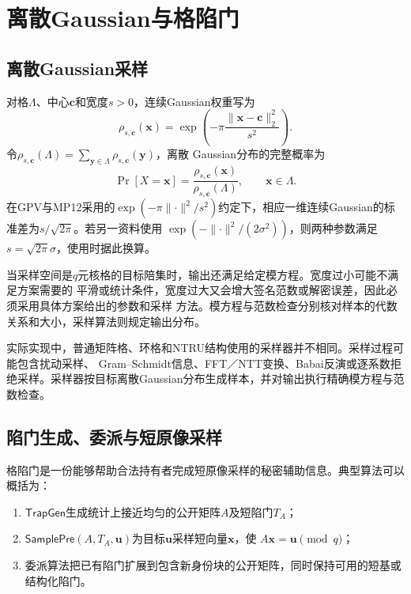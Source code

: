 \section{离散Gaussian与格陷门}

\subsection{离散Gaussian采样}

对格$\Lambda$、中心$\mathbf c$和宽度$s>0$，连续Gaussian权重写为
\[
 \rho_{s,\mathbf c}(\mathbf x)=
 \exp\!\left(-\pi\frac{\lVert\mathbf x-\mathbf c\rVert_2^2}{s^2}\right).
\]
令$\rho_{s,\mathbf c}(\Lambda)=\sum_{\mathbf y\in\Lambda}\rho_{s,\mathbf c}(\mathbf y)$，离散
Gaussian分布的完整概率为
\[
 \Pr[X=\mathbf x]
 =\frac{\rho_{s,\mathbf c}(\mathbf x)}{\rho_{s,\mathbf c}(\Lambda)},
 \qquad \mathbf x\in\Lambda.
\]
在GPV与MP12采用的$\exp(-\pi\lVert\cdot\rVert^2/s^2)$约定下，相应一维连续Gaussian的标准差为$s/\sqrt{2\pi}$。若另一资料使用
$\exp(-\lVert\cdot\rVert^2/(2\sigma^2))$，则两种参数满足$s=\sqrt{2\pi}\sigma$，使用时据此换算\cite{gpv2008,micciancio2012trapdoors}。

当采样空间是$q$元核格的目标陪集时，输出还满足给定模方程。宽度过小可能不满足方案需要的
平滑或统计条件，宽度过大又会增大签名范数或解密误差，因此必须采用具体方案给出的参数和采样
方法。模方程与范数检查分别核对样本的代数关系和大小，采样算法则规定输出分布。

实际实现中，普通矩阵格、环格和NTRU结构使用的采样器并不相同。采样过程可能包含扰动采样、
Gram--Schmidt信息、FFT／NTT变换、Babai反演或逐系数拒绝采样。采样器按目标离散Gaussian分布生成样本，并对输出执行精确模方程与范数检查。

\subsection{陷门生成、委派与短原像采样}

格陷门是一份能够帮助合法持有者完成短原像采样的秘密辅助信息。典型算法可以概括为：

\begin{enumerate}
  \item $\mathsf{TrapGen}$生成统计上接近均匀的公开矩阵$A$及短陷门$T_A$；
  \item $\mathsf{SamplePre}(A,T_A,\mathbf u)$为目标$\mathbf u$采样短向量$\mathbf x$，使
        $A\mathbf x=\mathbf u\pmod q$；
  \item 委派算法把已有陷门扩展到包含新身份块的公开矩阵，同时保持可用的短基或结构化陷门。
\end{enumerate}

